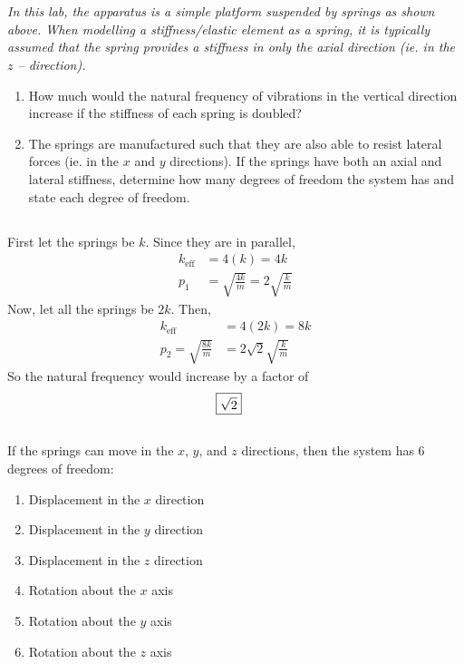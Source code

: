 \section{}
\textit{In this lab, the apparatus is a simple platform suspended by springs as shown above. When modelling a stiffness/elastic element as a spring, it is typically assumed that the spring provides a stiffness in only the axial direction (ie. in the $z$ – direction).}

\begin{enumerate}[label=(\alph*)]
    \item How much would the natural frequency of vibrations in the vertical direction increase if the stiffness of each spring is doubled?
    \item The springs are manufactured such that they are also able to resist lateral forces (ie. in the $x$ and $y$ directions). If the springs have both an axial and lateral stiffness, determine how many degrees of freedom the system has and state each degree of freedom.
\end{enumerate}
\subsection{}
First let the springs be $k$. Since they are in parallel,
\begin{align*}
    k_{\text{eff}} &= 4(k) = 4k \\
    p_1 &= \sqrt{\frac{4k}{m}} = 2\sqrt{\frac{k}{m}}
\end{align*}
Now, let all the springs be $2k$. Then,
\begin{align*}
    k_{\text{eff}} &= 4(2k) = 8k \\
    p_2 = \sqrt{\frac{8k}{m}} &= 2\sqrt{2}\sqrt{\frac{k}{m}}
\end{align*}
So the natural frequency would increase by a factor of 
\begin{align*}
    \Aboxed{\sqrt{2}}
\end{align*}

\subsection{}
If the springs can move in the $x$, $y$, and $z$ directions, then the system has 6 degrees of freedom:
\begin{enumerate}
    \item Displacement in the $x$ direction
    \item Displacement in the $y$ direction
    \item Displacement in the $z$ direction
    \item Rotation about the $x$ axis
    \item Rotation about the $y$ axis
    \item Rotation about the $z$ axis
\end{enumerate}